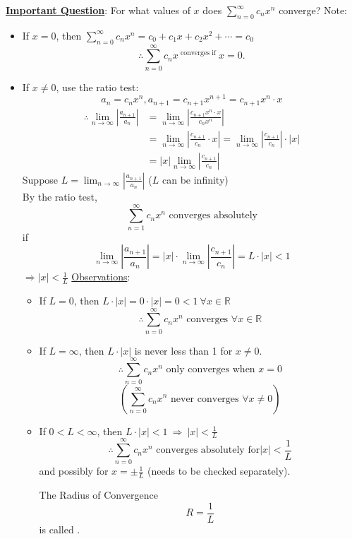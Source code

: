 \documentclass[12pt,a4paper]{article}
\def\R{{\mathbb{R}}}
\begin{document}
\begin{thm}{\underline{\textbf{Important Question}}: For what values of $x$ does $\displaystyle\sum_{n=0}^\infty c_n x^n$ converge?}
Note: 
\begin{itemize}
	\item If $x=0$, then $\displaystyle\sum_{n=0}^\infty c_n x^n=c_0+c_1x+c_2x^2+\cdots =c_0$
	$$\therefore\sum_{n=0}^\infty c_n x^\text{ converges if }x=0.$$
	\item If $x\neq0$, use the ratio test: 
	$$a_n=c_n x^n, a_{n+1}=c_{n+1}x^{n+1}=c_{n+1}x^n\cdot x$$
	$$\begin{aligned}
		\therefore\lim_{n\to\infty}\left|\frac{a_{n+1}}{a_n}\right|&=\lim_{n\to\infty}\left|\frac{c_{n+1}x^n\cdot x}{c_n x^n}\right|\\
		&=\lim_{n\to\infty}\left|\frac{c_{n+1}}{c_n}\cdot x\right|=\lim_{n\to\infty}\left|\frac{c_{n+1}}{c_{n}}\right|\cdot|x|\\
		&=|x|\lim_{n\to\infty}\left|\frac{c_{n+1}}{c_n}\right|
	\end{aligned}$$
	Suppose $\displaystyle L=\lim_{n\to\infty}\left|\frac{a_{n+1}}{a_n}\right|$ ($L$ can be infinity)\\
	By the ratio test, 
	$$\sum_{n=1}^\infty c_n x^n\text{ converges absolutely}$$
	if $$\lim_{n\to\infty}\left|\frac{a_{n+1}}{a_n}\right|=|x|\cdot\lim_{n\to\infty}\left|\frac{c_{n+1}}{c_n}\right|=L\cdot|x|<1$$
	$\displaystyle\Rightarrow |x|<\frac{1}{L}$
	\underline{Observations}:
	\begin{itemize}
		\item If $L=0$, then $L\cdot|x|=0\cdot|x|=0<1\ \forall x\in\R$
		$$\therefore\sum_{n=0}^\infty c_n x^n\text{ converges }\forall x\in\R$$
		\item If $\displaystyle L=\infty$, then $L\cdot|x|$ is never less than 1 for $x\neq0$.
		$$\therefore\sum_{n=0}^\infty c_n x^n\text{ only converges when }x=0$$
		$$\left(\sum_{n=0}^\infty c_n x^n\text{ never converges }\forall x\neq0\right)$$
		\item If $\displaystyle 0<L<\infty$, then $L\cdot|x|<1\ \Rightarrow\ |x|<\frac{1}{L}$
		$$\therefore\sum_{n=0}^\infty c_n x^n\text{ converges absolutely for} |x|<\frac{1}{L}$$ and possibly for $\displaystyle x=\pm\frac{1}{L}$ (needs to be checked separately).
		\begin{df}{The Radius of Convergence}
			$$R=\frac{1}{L}$$ is called {}.
		\end{df}
	\end{itemize}
\end{itemize}
\end{thm}
\end{document}
